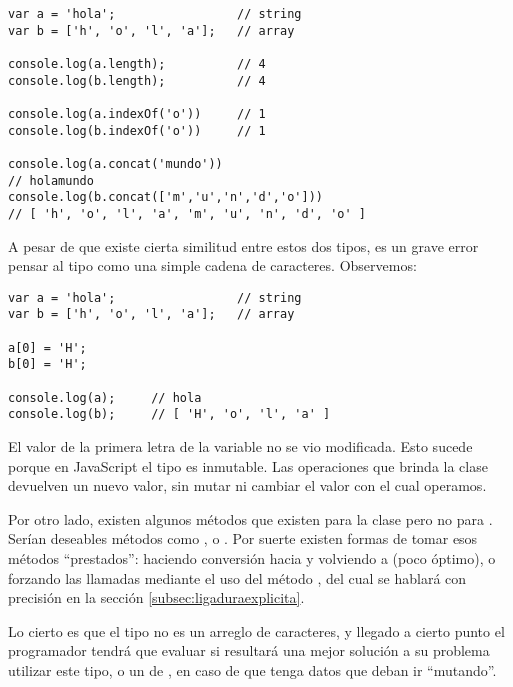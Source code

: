\begin{lstlisting}[title={Similitudes entre \code{string} y un \code{array}}]
var a = 'hola';                 // string
var b = ['h', 'o', 'l', 'a'];   // array

console.log(a.length);          // 4
console.log(b.length);          // 4

console.log(a.indexOf('o'))     // 1
console.log(b.indexOf('o'))     // 1

console.log(a.concat('mundo'))  
// holamundo
console.log(b.concat(['m','u','n','d','o']))
// ​​​​​[ 'h', 'o', 'l', 'a', 'm', 'u', 'n', 'd', 'o' ]​​​​​
\end{lstlisting}

A pesar de que existe cierta similitud entre estos dos tipos, es un grave error pensar al tipo  como una simple cadena de caracteres. Observemos:

\begin{lstlisting}
var a = 'hola';                 // string
var b = ['h', 'o', 'l', 'a'];   // array

a[0] = 'H';
b[0] = 'H';

console.log(a);		// hola
console.log(b);		// ​​​​​[ 'H', 'o', 'l', 'a' ]​​​​​
\end{lstlisting}

El valor de la primera letra de la variable  no se vio modificada. Esto sucede porque en JavaScript el tipo  es inmutable. Las operaciones que brinda la clase  devuelven un nuevo valor, sin mutar ni cambiar el valor con el cual operamos.

Por otro lado, existen algunos métodos que existen para la clase  pero no para . Serían deseables métodos como ,  o . Por suerte existen formas de tomar esos métodos "`prestados"': haciendo conversión hacia  y volviendo a  (poco óptimo), o forzando las llamadas mediante el uso del método , del cual se hablará con precisión en la sección \ref{subsec:ligaduraexplicita}.

Lo cierto es que el tipo  no es un arreglo de caracteres, y llegado a cierto punto el programador tendrá que evaluar si resultará una mejor solución a su problema utilizar este tipo, o un  de , en caso de que tenga datos que deban ir "`mutando"'.

\subsection{}


